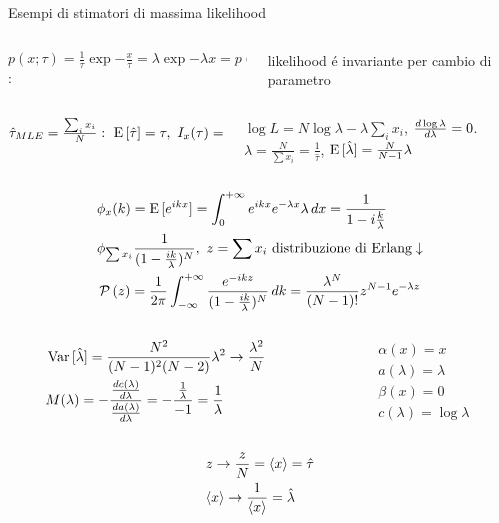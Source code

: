 \begin{wordonframe}{Esempi di stimatori di massima likelihood}
\begin{columns}[T]
\begin{column}{0.6\textwidth}
 $p(x;\tau)=\frac{1}{\tau}\exp{-\frac{x}{\tau}}=\lambda\exp{-\lambda x}=p(x;\lambda)$:
\end{column}
\begin{column}{0.4\textwidth}
likelihood \'e invariante per cambio di parametro
\end{column}
\end{columns}
\begin{columns}[b]
\begin{column}{0.4\textwidth}
$\hat{\tau}_{MLE}=\frac{\sum_ix_i}{N}:\ \E{[\hat{\tau}]}=\tau,\ I_x(\tau)=\frac{1}{\var{\hat{\tau}}},\ \var{\hat{\tau}}=\frac{\tau^2}{N}$
\end{column}
\begin{column}{0.6\textwidth}
$\log{L}=N\log{\lambda}-\lambda\sum_ix_i$, $\frac{d \log{\lambda}}{d \lambda}=0$. $\hat{\lambda}=\frac{N}{\sum x_i}=\frac{1}{\hat{\tau}}$, $\operatorname{E}{[\hat{\lambda}]}=\frac{N}{N-1}\lambda$
\end{column}
\end{columns}
\begin{align*}
&\phi_x(k)=\E{[\exp{ikx}]}=\intzi\exp{ikx}\exp{-\lambda x}\lambda\,dx=\frac{1}{1-i\frac{k}{\lambda}}\\
&\phi_{\sum x_i}\frac{1}{(1-\frac{ik}{\lambda})^N},\ z=\sum x_i\ \text{distribuzione di Erlang}\downarrow\\
&\prob{(z)}=\frac{1}{2\pi}\intsinf{}\frac{\exp{-ikz}}{(1-\frac{ik}{\lambda})^N}\,dk=\frac{\lambda^N}{(N-1)!}z^{N-1}\exp{-\lambda z}
\end{align*}
\begin{columns}[T]
\begin{column}{0.65\textwidth}
\begin{align*}
&\operatorname{Var}{[\hat{\lambda}]}=\frac{N^2}{(N-1)^2(N-2)}\lambda^2\to\frac{\lambda^2}{N}\\
&M(\lambda)=-\frac{\frac{d c(\lambda)}{d \lambda}}{\frac{d a(\lambda)}{d \lambda}}=-\frac{\frac{1}{\lambda}}{-1}=\frac{1}{\lambda}
\end{align*}
\end{column}
\begin{column}{0.35\textwidth}
\begin{align*}
&\alpha(x)=x\\
&a(\lambda)=\lambda\\
&\beta(x)=0\\
&c(\lambda)=\log{\lambda}
\end{align*}
\end{column}
\end{columns}
\begin{align*}
&z\to\frac{z}{N}=\langle x \rangle=\hat{\tau}\\
&\langle x \rangle\to\frac{1}{\langle x \rangle}=\hat{\lambda}
\end{align*}


\end{wordonframe}
